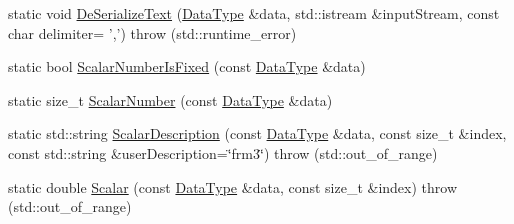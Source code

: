 \begin{DoxyCompactItemize}
\item 
static void \hyperlink{classcmn_data_3_01vct_frame_base_3_01__rotation_type_01_4_01_4_a5ca9678bb39c6a214166fafe958fe07f}{De\-Serialize\-Text} (\hyperlink{classcmn_data_3_01vct_frame_base_3_01__rotation_type_01_4_01_4_a6d3becc05b41db88283c842177d23bea}{Data\-Type} \&data, std\-::istream \&input\-Stream, const char delimiter= ',')  throw (std\-::runtime\-\_\-error)
\item 
static bool \hyperlink{classcmn_data_3_01vct_frame_base_3_01__rotation_type_01_4_01_4_aed8e8d3ef360eac67bd60ced6f5e2cf6}{Scalar\-Number\-Is\-Fixed} (const \hyperlink{classcmn_data_3_01vct_frame_base_3_01__rotation_type_01_4_01_4_a6d3becc05b41db88283c842177d23bea}{Data\-Type} \&data)
\item 
static size\-\_\-t \hyperlink{classcmn_data_3_01vct_frame_base_3_01__rotation_type_01_4_01_4_a2e9b4a5543d322748194b62eebcaccd1}{Scalar\-Number} (const \hyperlink{classcmn_data_3_01vct_frame_base_3_01__rotation_type_01_4_01_4_a6d3becc05b41db88283c842177d23bea}{Data\-Type} \&data)
\item 
static std\-::string \hyperlink{classcmn_data_3_01vct_frame_base_3_01__rotation_type_01_4_01_4_ab0c8cb32d33f7b3f6b7d89098fc1b6e3}{Scalar\-Description} (const \hyperlink{classcmn_data_3_01vct_frame_base_3_01__rotation_type_01_4_01_4_a6d3becc05b41db88283c842177d23bea}{Data\-Type} \&data, const size\-\_\-t \&index, const std\-::string \&user\-Description=\char`\"{}frm3\char`\"{})  throw (std\-::out\-\_\-of\-\_\-range)
\item 
static double \hyperlink{classcmn_data_3_01vct_frame_base_3_01__rotation_type_01_4_01_4_a15ca452dc355cfa4ad26fea3cf7d632c}{Scalar} (const \hyperlink{classcmn_data_3_01vct_frame_base_3_01__rotation_type_01_4_01_4_a6d3becc05b41db88283c842177d23bea}{Data\-Type} \&data, const size\-\_\-t \&index)  throw (std\-::out\-\_\-of\-\_\-range)
\end{DoxyCompactItemize}


